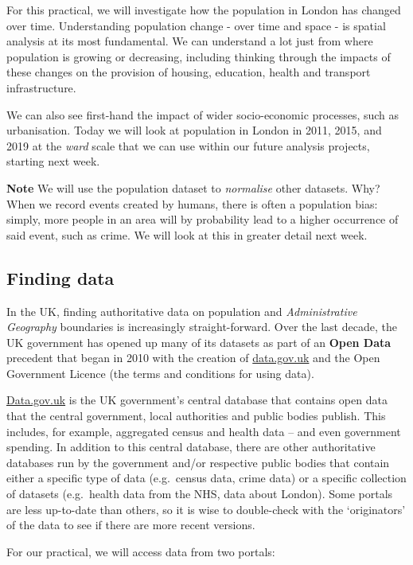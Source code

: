 \documentclass[
]{book}
\begin{document}
For this practical, we will investigate how the population in London has changed over time. Understanding population change - over time and space - is spatial analysis at its most fundamental. We can understand a lot just from where population is growing or decreasing, including thinking through the impacts of these changes on the provision of housing, education, health and transport infrastructure.

We can also see first-hand the impact of wider socio-economic processes, such as urbanisation. Today we will look at population in London in 2011, 2015, and 2019 at the \emph{ward} scale that we can use within our future analysis projects, starting next week.

\textbf{Note}
We will use the population dataset to \emph{normalise} other datasets. Why? When we record events created by humans, there is often a population bias: simply, more people in an area will by probability lead to a higher occurrence of said event, such as crime. We will look at this in greater detail next week.

\hypertarget{w02-finding}{%
\subsection{Finding data}\label{w02-finding}}

In the UK, finding authoritative data on population and \emph{Administrative Geography} boundaries is increasingly straight-forward. Over the last decade, the UK government has opened up many of its datasets as part of an \textbf{Open Data} precedent that began in 2010 with the creation of \url{data.gov.uk} and the Open Government Licence (the terms and conditions for using data).

\href{www.data.gov.uk}{Data.gov.uk} is the UK government's central database that contains open data that the central government, local authorities and public bodies publish. This includes, for example, aggregated census and health data -- and even government spending. In addition to this central database, there are other authoritative databases run by the government and/or respective public bodies that contain either a specific type of data (e.g.~census data, crime data) or a specific collection of datasets (e.g.~health data from the NHS, data about London). Some portals are less up-to-date than others, so it is wise to double-check with the `originators' of the data to see if there are more recent versions.

For our practical, we will access data from two portals:
\end{document}
